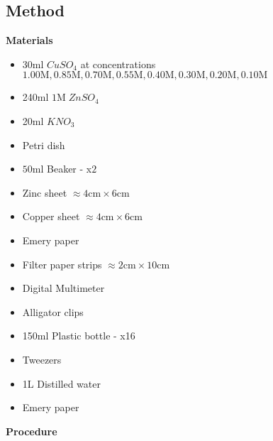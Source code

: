 \documentclass[11pt,a4paper]{article}
\begin{document}
\subsection{Method}
\textbf{Materials}
\begin{itemize}
	\item 30ml $CuSO_4$ at concentrations $1.00\textrm{M}, 0.85\textrm{M}, 0.70\textrm{M}, 0.55\textrm{M}, 0.40\textrm{M}, 0.30\textrm{M}, 0.20\textrm{M}, 0.10\textrm{M}$
	\item 240ml $1$M$\;ZnSO_4$
	\item 20ml $KNO_3$
	\item Petri dish
	\item $50\textrm{ml}$ Beaker - x$2$
	\item Zinc sheet $\approx4\textrm{cm}\times6\textrm{cm}$ 
	\item Copper sheet $\approx4\textrm{cm}\times6\textrm{cm}$ 
	\item Emery paper
	\item Filter paper strips $\approx 2\textrm{cm}\times10\textrm{cm}$
	\item Digital Multimeter
	\item Alligator clips
	\item 150ml Plastic bottle - x16
	\item Tweezers 
	\item 1L Distilled water
	\item Emery paper
\end{itemize}
\newpage
\textbf{Procedure}
\small
\end{document}

